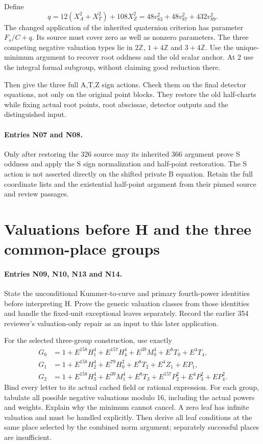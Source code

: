 \documentclass{article}
\begin{document}
Define
\[
 q=12(X_A^2+X_T^2)+108X_Z^2
   =48v_{83}^2+48v_{87}^2+432v_{89}^2.
\]
The changed application of the inherited quaternion criterion has
parameter $F_s/C+q$. Its source must cover zero as well as nonzero
parameters. The three competing negative valuation types lie in
$2\mathbb Z$, $1+4\mathbb Z$ and $3+4\mathbb Z$.
Use the unique-minimum argument to recover root oddness and the old
scalar anchor. At 2 use the integral formal subgroup, without claiming
good reduction there.

Then give the three full A,T,Z sign actions. Check them on the final
detector equations, not only on the original point blocks. They restore
the old half-charts while fixing actual root points, root abscissae,
detector outputs and the distinguished input.

\paragraph{Entries N07 and N08.}
Only after restoring the 326 source may its inherited 366 argument prove
S oddness and apply the S sign normalization and half-point restoration.
The S action is not asserted directly on the shifted private B equation.
Retain the full coordinate lists and the existential half-point argument
from their pinned source and review passages.

\section{Valuations before H and the three common-place groups}
\label{outline:detectors}
\paragraph{Entries N09, N10, N13 and N14.}
State the unconditional Kummer-to-curve and primary fourth-power
identities before interpreting H. Prove the generic valuation classes
from those identities and handle the fixed-unit exceptional leaves
separately. Record the earlier 354 reviewer's valuation-only repair
as an input to this later application.

For the selected three-group construction, use exactly
\begin{align*}
 G_0&=1+E^{158}H_1^4+E^{157}H_4^4+E^{39}M_0^4+E^8T_0+E^4T_4,\\
 G_1&=1+E^{158}H_2^4+E^{79}H_0^2+E^8T_2+E^4Z_1+EP_1,\\
 G_2&=1+E^{158}H_3^4+E^{39}M_1^4+E^8T_3+E^{157}P_2^2+E^4P_3^2+EP_4^2.
\end{align*}
Bind every letter to its actual cached field or rational expression.
For each group, tabulate all possible negative valuations modulo 16,
including the actual powers and weights. Explain why the minimum cannot
cancel. A zero leaf has infinite valuation and must be handled explicitly.
Then derive all leaf conditions at the same place selected by the
combined norm argument; separately successful places are insufficient.
\end{document}
